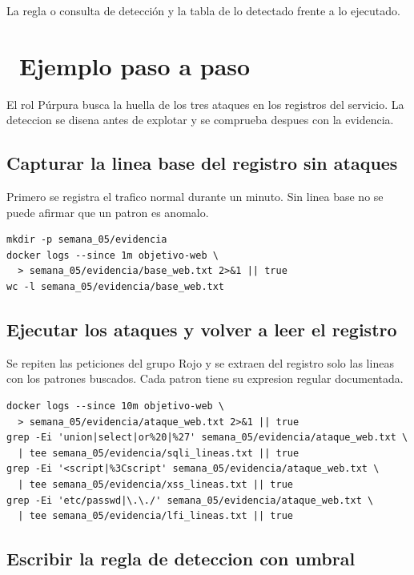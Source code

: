 \documentclass[11pt,a4paper]{article}
\newcommand{\iconotexto}[2]{\textcolor{cyanNeon}{\faIcon{#1}}~#2}
\begin{document}
La regla o consulta de detección y la tabla de lo detectado frente a lo ejecutado.

\section{\iconotexto{list-ol}{Ejemplo paso a paso}}

El rol Púrpura busca la huella de los tres ataques en los registros del servicio. La deteccion se disena antes de explotar y se comprueba despues con la evidencia.

\subsection{Capturar la linea base del registro sin ataques}

Primero se registra el trafico normal durante un minuto. Sin linea base no se puede afirmar que un patron es anomalo.

\begin{lstlisting}[style=estiloCodigo]
mkdir -p semana_05/evidencia
docker logs --since 1m objetivo-web \
  > semana_05/evidencia/base_web.txt 2>&1 || true
wc -l semana_05/evidencia/base_web.txt
\end{lstlisting}

\subsection{Ejecutar los ataques y volver a leer el registro}

Se repiten las peticiones del grupo Rojo y se extraen del registro solo las lineas con los patrones buscados. Cada patron tiene su expresion regular documentada.

\begin{lstlisting}[style=estiloCodigo]
docker logs --since 10m objetivo-web \
  > semana_05/evidencia/ataque_web.txt 2>&1 || true
grep -Ei 'union|select|or%20|%27' semana_05/evidencia/ataque_web.txt \
  | tee semana_05/evidencia/sqli_lineas.txt || true
grep -Ei '<script|%3Cscript' semana_05/evidencia/ataque_web.txt \
  | tee semana_05/evidencia/xss_lineas.txt || true
grep -Ei 'etc/passwd|\.\./' semana_05/evidencia/ataque_web.txt \
  | tee semana_05/evidencia/lfi_lineas.txt || true
\end{lstlisting}

\subsection{Escribir la regla de deteccion con umbral}
\end{document}
